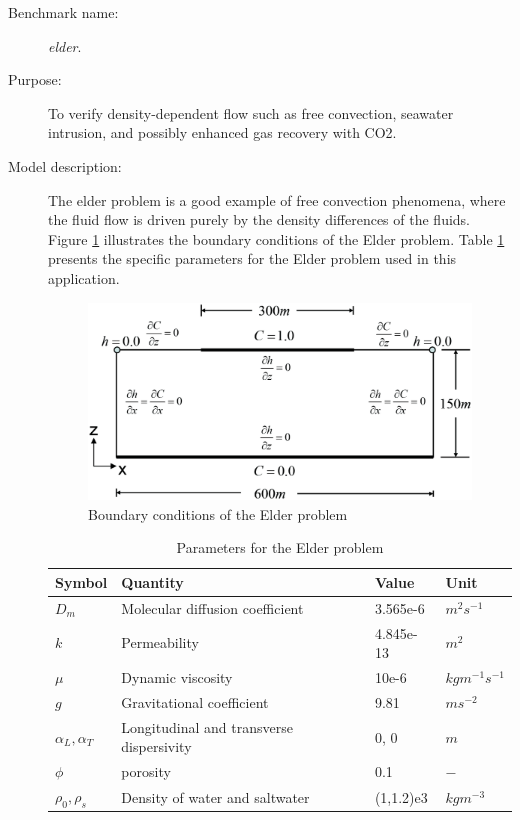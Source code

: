 \begin{description}
  \item[Benchmark name:] \emph{elder}.
  \item[Purpose:] To verify density-dependent flow such as free
  convection, seawater intrusion, and possibly enhanced gas recovery
  with CO2.

\item[Model description:] The elder problem is a good example of
free convection phenomena, where the fluid flow is driven purely by
the density differences of the fluids. Figure \ref{ElderProblemBC}
illustrates the boundary conditions of the Elder problem. Table
\ref{TableElder} presents the specific parameters for the Elder
problem used in this application.

\begin{figure}[h]
\centering
\includegraphics[scale=0.25]{DENSITY-DEPENDENT_FLOW/figures/elder_bc.eps}
\caption{Boundary conditions of the Elder problem}
\label{ElderProblemBC}
\end{figure}


\begin{table}[H]
\begin{center}
\begin{tabular}{llll}
\hline \hline
Symbol & Quantity   &  Value  & Unit\\
\hline \hline
 $D _m$ & Molecular diffusion coefficient & 3.565e-6  &  $m^2 s^{ - 1}$ \\
 $k$ & Permeability & 4.845e-13  &  $m^2$ \\
 $\mu$ & Dynamic viscosity & 10e-6  &  $kg m^{ - 1} s^{ - 1}$ \\
 $g$ & Gravitational coefficient & 9.81  &  $m s^{ - 2}$ \\
 $\alpha _L , \alpha _T$ & Longitudinal and transverse dispersivity & 0, 0  &  $m$ \\
 $\phi$ & porosity & 0.1  &  $-$ \\
 $\rho _0 , \rho _s$ & Density of water and saltwater & (1,1.2)e3  &  $kg m^{ - 3}$ \\
\hline \hline
\end{tabular}
\end{center}
\caption{Parameters for the Elder problem} \label{TableElder}
\end{table}



\end{description}
